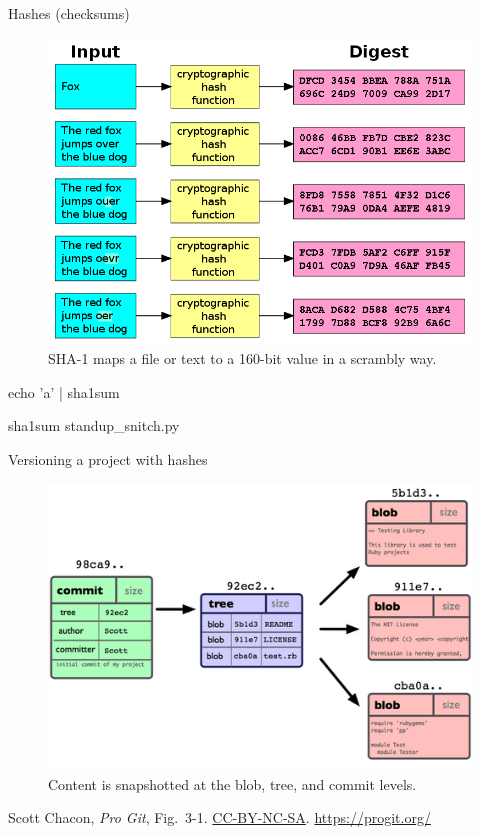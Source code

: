 \begin{frame}[fragile]{Hashes (checksums)}
  \begin{figure}
    \includegraphics[scale=0.3]{hash_functions.png}
    \\ SHA-1 maps a file or text to a 160-bit value in a scrambly way.
  \end{figure}

  \begin{gitCommand}echo 'a' | sha1sum\end{gitCommand}

  \begin{gitCommand}sha1sum standup_snitch.py\end{gitCommand}
\end{frame}

\begin{frame}{Versioning a project with hashes}
  \begin{figure}
    \includegraphics[scale=1.0]{18333fig0301-tn.png}
    \\ Content is snapshotted at the blob, tree, and commit levels.
  \end{figure}
  \footnotesize{Scott Chacon,
    \emph{Pro Git},
    Fig.~3-1.
    \href{https://creativecommons.org/licenses/by-nc-sa/3.0/legalcode}{CC-BY-NC-SA}.
    \href{https://progit.org/}{https://progit.org/}}
\end{frame}

